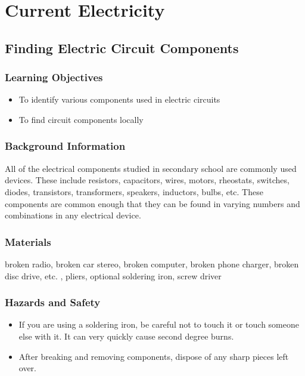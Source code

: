 \section{Current Electricity}

\subsection{Finding Electric Circuit Components}

\subsubsection*{Learning Objectives}
\begin{itemize}
\item{To identify various components used in electric circuits} 
\item{To find circuit components locally} 
\end{itemize}

\subsubsection*{Background Information}
All of the electrical components studied in secondary school are commonly used devices. These include resistors, capacitors, wires, motors, rheostats, switches, diodes, transistors, transformers, speakers, inductors, bulbs, etc. These components are common enough that they can be found in varying numbers and combinations in any electrical device.  

\subsubsection*{Materials}
broken radio, broken car stereo, broken computer, broken phone charger, broken disc drive, etc.  , pliers, optional soldering iron, screw driver

\subsubsection*{Hazards and Safety}
\begin{itemize}
\item{If you are using a soldering iron, be careful not to touch it or touch someone else with it. It can very quickly cause second degree burns.} 
\item{After breaking and removing components, dispose of any sharp pieces left over.} 
\end{itemize}

